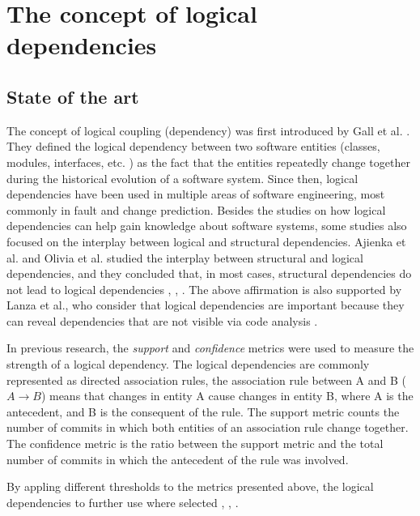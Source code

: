 \documentclass[runningheads]{comsis2}
\begin{document}
\section{The concept of logical dependencies}

\subsection{State of the art}

The concept of logical coupling (dependency) was first introduced by Gall et al. \cite{Gall:1998:DLC:850947.853338}. They defined the logical dependency between two software entities (classes, modules, interfaces, etc. ) as the fact that the entities repeatedly change together during the historical evolution of a software system.
Since then, logical dependencies have been used in multiple areas of software engineering, most commonly in fault and change prediction.  
Besides the studies on how logical dependencies can help gain knowledge about software systems, some studies also focused on the interplay between logical and structural dependencies. Ajienka et al. and Olivia et al. studied the interplay between structural and logical dependencies, and they concluded that, in most cases, structural dependencies do not lead to logical dependencies \cite{Oliva:2011:ISL:2067853.2068086}, \cite{DBLP:conf/issre/OlivaG15}, \cite{DBLP:journals/jss/AjienkaC17}. The above affirmation is also supported by Lanza et al., who consider that logical dependencies are important because they can reveal dependencies that are not visible via code analysis \cite{inproceedings_radar_evolution}.



In previous research, the \textit{support} and \textit{confidence} metrics were used to measure the strength of a logical dependency. 
The logical dependencies are commonly represented as directed association rules, the association rule between A and B ( $A \rightarrow B$) means that changes in entity A cause changes in entity B, where A is the antecedent, and B is the consequent of the rule. 
The support metric counts the number of commits in which both entities of an association rule change together. The confidence metric is the ratio between the support metric and the total number of commits in which the antecedent of the rule was involved. 

By appling different thresholds to the metrics presented above, the logical dependencies to further use where selected \cite{DBLP:conf/issre/OlivaG15}, \cite{DBLP:journals/jss/AjienkaC17}, \cite{Zimmermann:2004:MVH:998675.999460}.
\end{document}
